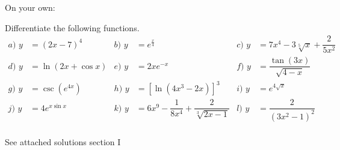 \documentclass[]{ximera}
\begin{document}
On your own:
\begin{problem}

Differentiate the following functions.
\begin{align*}
a)  \, \, y &= (2x-7)^4  & b) \, \, y &=  e^{\frac{x}{4}} & c) \, \, y&= 7x^4-3\sqrt[5]{x} + \dfrac{2}{5x^2} \\
d) \, \, y&= \ln(2x+\cos x) & e) \, \, y&=2xe^{-x} & f) \, \, y&= \dfrac{\tan{(3x)}}{\sqrt{4-x}} \\
g) \, \, y&= \csc{\left(e^{4x}\right)} & h) \, \, y&= [\ln(4x^3-2x)]^3 & i) \, \, y&= e^{4 \sqrt{x}} \\
j) \, \, y&=4e^{x \sin x} & k) \, \, y&= 6x^9-\dfrac{1}{8x^4}+\dfrac{2}{\sqrt[3]{2x-1}} & l) \, \, y &=\dfrac{2}{(3x^2-1)^2} \\
\end{align*}

	\begin{freeResponse}		
	See attached solutions section I
	\end{freeResponse}


	
\end{problem}
\end{document}
